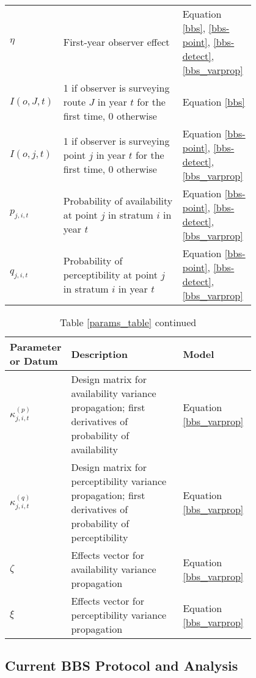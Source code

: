 \begin{table}[!ht]
\begin{tabular}[t]{l>{\raggedright}p{0.5\linewidth}>{\raggedright\arraybackslash}p{0.3\linewidth}}
		$\eta$&First-year observer effect&Equation \ref{bbs}, \ref{bbs-point}, \ref{bbs-detect}, \ref{bbs_varprop}\\
		$I(o,J,t)$&1 if observer is surveying route $J$ in year $t$ for the first time, 0 otherwise&Equation \ref{bbs}\\
		$I(o,j,t)$&1 if observer is surveying point $j$ in year $t$ for the first time, 0 otherwise&Equation \ref{bbs-point}, \ref{bbs-detect}, \ref{bbs_varprop}\\
		$p_{j,i,t}$&Probability of availability at point $j$ in stratum $i$ in year $t$&Equation \ref{bbs-point}, \ref{bbs-detect}, \ref{bbs_varprop}\\
		$q_{j,i,t}$&Probability of perceptibility at point $j$ in stratum $i$ in year $t$&Equation \ref{bbs-point}, \ref{bbs-detect}, \ref{bbs_varprop}\\
		\hline
	\end{tabular}
\end{table}

\begin{table}[!ht]
	\caption{Table \ref{params_table} continued}
	\begin{tabular}[t]{l>{\raggedright}p{0.5\linewidth}>{\raggedright\arraybackslash}p{0.3\linewidth}}
		\hline
		Parameter or Datum&Description&Model\\
		\hline
		$\kappa_{j,i,t}^{(p)}$&Design matrix for availability variance propagation; first derivatives of probability of availability \citep{bravington_variance_2021}&Equation \ref{bbs_varprop}\\
		$\kappa_{j,i,t}^{(q)}$&Design matrix for perceptibility variance propagation; first derivatives of probability of perceptibility \citep{bravington_variance_2021}&Equation \ref{bbs_varprop}\\
		$\zeta$&Effects vector for availability variance propagation \citep{bravington_variance_2021}&Equation \ref{bbs_varprop}\\
		$\xi$&Effects vector for perceptibility variance propagation \citep{bravington_variance_2021}&Equation \ref{bbs_varprop}\\
		\hline
	\end{tabular}
\end{table}

\subsection{Current BBS Protocol and Analysis}\label{current-bbs}

